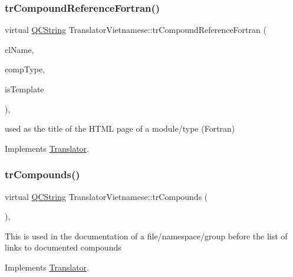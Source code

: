 \subsubsection{\texorpdfstring{trCompoundReferenceFortran()}{trCompoundReferenceFortran()}}
{\footnotesize\ttfamily virtual \mbox{\hyperlink{class_q_c_string}{Q\+C\+String}} Translator\+Vietnamese\+::tr\+Compound\+Reference\+Fortran (\begin{DoxyParamCaption}\item[{const char $\ast$}]{cl\+Name,  }\item[{\mbox{\hyperlink{class_class_def_ae70cf86d35fe954a94c566fbcfc87939}{Class\+Def\+::\+Compound\+Type}}}]{comp\+Type,  }\item[{bool}]{is\+Template }\end{DoxyParamCaption})\hspace{0.3cm}{\ttfamily [inline]}, {\ttfamily [virtual]}}

used as the title of the H\+T\+ML page of a module/type (Fortran) 

Implements \mbox{\hyperlink{class_translator}{Translator}}.

\mbox{\label{class_translator_vietnamese_a98bce7410085eef608ea0d7ae8fb1442}} 
\subsubsection{\texorpdfstring{trCompounds()}{trCompounds()}}
{\footnotesize\ttfamily virtual \mbox{\hyperlink{class_q_c_string}{Q\+C\+String}} Translator\+Vietnamese\+::tr\+Compounds (\begin{DoxyParamCaption}{ }\end{DoxyParamCaption})\hspace{0.3cm}{\ttfamily [inline]}, {\ttfamily [virtual]}}

This is used in the documentation of a file/namespace/group before the list of links to documented compounds 

Implements \mbox{\hyperlink{class_translator}{Translator}}.

\mbox{\label{class_translator_vietnamese_aab3ffec2e43354dbd03571496d4031d3}} 
